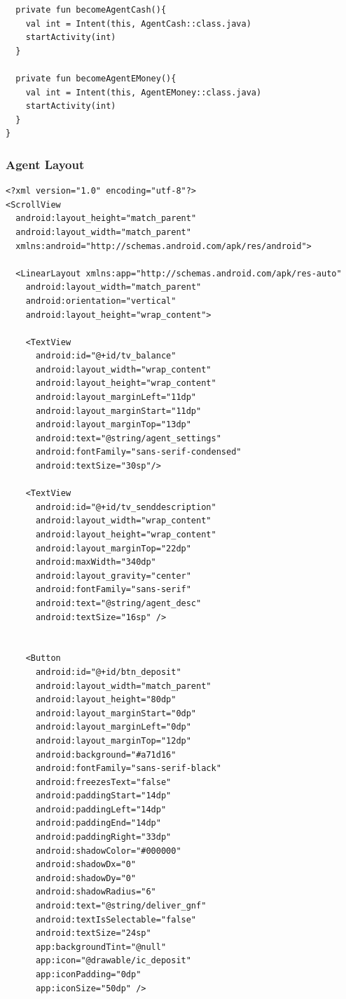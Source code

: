 \documentclass[11pt, a4paper]{article}
\begin{document}
\begin{appendices}
\begin{lstlisting}
  private fun becomeAgentCash(){
    val int = Intent(this, AgentCash::class.java)
    startActivity(int)
  }

  private fun becomeAgentEMoney(){
    val int = Intent(this, AgentEMoney::class.java)
    startActivity(int)
  }
}
\end{lstlisting}
\subsubsection{Agent Layout}
\begin{lstlisting}
<?xml version="1.0" encoding="utf-8"?>
<ScrollView
  android:layout_height="match_parent"
  android:layout_width="match_parent"
  xmlns:android="http://schemas.android.com/apk/res/android">

  <LinearLayout xmlns:app="http://schemas.android.com/apk/res-auto"
    android:layout_width="match_parent"
    android:orientation="vertical"
    android:layout_height="wrap_content">

    <TextView
      android:id="@+id/tv_balance"
      android:layout_width="wrap_content"
      android:layout_height="wrap_content"
      android:layout_marginLeft="11dp"
      android:layout_marginStart="11dp"
      android:layout_marginTop="13dp"
      android:text="@string/agent_settings"
      android:fontFamily="sans-serif-condensed"
      android:textSize="30sp"/>

    <TextView
      android:id="@+id/tv_senddescription"
      android:layout_width="wrap_content"
      android:layout_height="wrap_content"
      android:layout_marginTop="22dp"
      android:maxWidth="340dp"
      android:layout_gravity="center"
      android:fontFamily="sans-serif"
      android:text="@string/agent_desc"
      android:textSize="16sp" />


    <Button
      android:id="@+id/btn_deposit"
      android:layout_width="match_parent"
      android:layout_height="80dp"
      android:layout_marginStart="0dp"
      android:layout_marginLeft="0dp"
      android:layout_marginTop="12dp"
      android:background="#a71d16"
      android:fontFamily="sans-serif-black"
      android:freezesText="false"
      android:paddingStart="14dp"
      android:paddingLeft="14dp"
      android:paddingEnd="14dp"
      android:paddingRight="33dp"
      android:shadowColor="#000000"
      android:shadowDx="0"
      android:shadowDy="0"
      android:shadowRadius="6"
      android:text="@string/deliver_gnf"
      android:textIsSelectable="false"
      android:textSize="24sp"
      app:backgroundTint="@null"
      app:icon="@drawable/ic_deposit"
      app:iconPadding="0dp"
      app:iconSize="50dp" />


\end{lstlisting}
\end{appendices}
\end{document}
